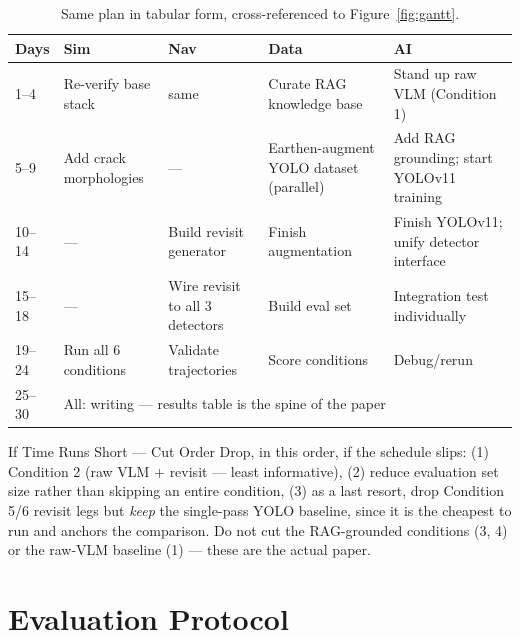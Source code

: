 \documentclass[11pt,a4paper]{article}
\begin{document}
\begin{table}[h!]
\centering
\small
\begin{tabular}{p{1.4cm}p{2.4cm}p{2.4cm}p{2.4cm}p{2.4cm}}
\toprule
\textbf{Days} & \textbf{Sim} & \textbf{Nav} & \textbf{Data} & \textbf{AI} \\
\midrule
1--4 & Re-verify base stack & same & Curate RAG knowledge base & Stand up raw VLM (Condition 1) \\
5--9 & Add crack morphologies & --- & Earthen-augment YOLO dataset (parallel) & Add RAG grounding; start YOLOv11 training \\
10--14 & --- & Build revisit generator & Finish augmentation & Finish YOLOv11; unify detector interface \\
15--18 & --- & Wire revisit to all 3 detectors & Build eval set & Integration test individually \\
19--24 & Run all 6 conditions & Validate trajectories & Score conditions & Debug/rerun \\
25--30 & \multicolumn{4}{l}{All: writing --- results table is the spine of the paper} \\
\bottomrule
\end{tabular}
\caption{Same plan in tabular form, cross-referenced to Figure~\ref{fig:gantt}.}
\end{table}

\begin{riskbox}{If Time Runs Short --- Cut Order}
Drop, in this order, if the schedule slips: (1) Condition 2 (raw VLM + revisit --- least informative), (2) reduce evaluation set size rather than skipping an entire condition, (3) as a last resort, drop Condition 5/6 revisit legs but \emph{keep} the single-pass YOLO baseline, since it is the cheapest to run and anchors the comparison. Do not cut the RAG-grounded conditions (3, 4) or the raw-VLM baseline (1) --- these are the actual paper.
\end{riskbox}

\section{Evaluation Protocol}
\label{sec:eval}
\end{document}
